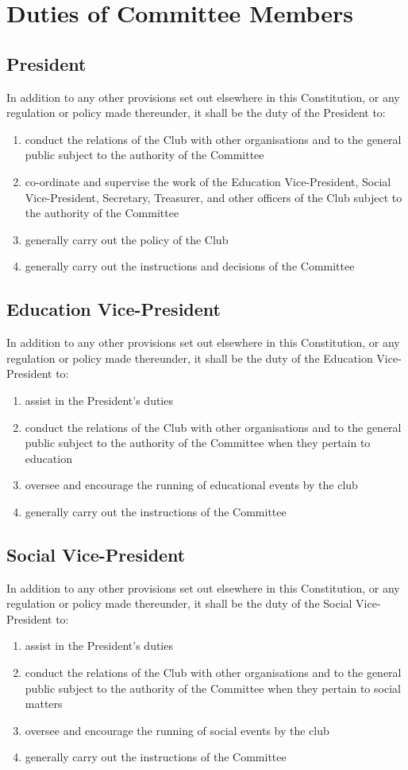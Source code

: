 \documentclass[11pt]{article} %
\begin{document}
\section{Duties of Committee Members}
\subsection{President}
In addition to any other provisions set out elsewhere in this Constitution, or any regulation or policy made thereunder, it shall be the duty of the President to:
\begin{enumerate}
	\item conduct the relations of the Club with other organisations and to the general public subject to the authority of the Committee
	\item co-ordinate and supervise the work of the Education Vice-President, Social Vice-President, Secretary, Treasurer, and other officers of the Club subject to the authority of the Committee
	\item generally carry out the policy of the Club
	\item generally carry out the instructions and decisions of the Committee
\end{enumerate}

\subsection{Education Vice-President}
In addition to any other provisions set out elsewhere in this Constitution, or any regulation or policy made thereunder, it shall be the duty of the Education Vice-President to:
\begin{enumerate}
	\item assist in the President's duties
	\item conduct the relations of the Club with other organisations and to the general public subject to the authority of the Committee when they pertain to education
	\item oversee and encourage the running of educational events by the club
	\item generally carry out the instructions of the Committee
\end{enumerate}

\subsection{Social Vice-President}
In addition to any other provisions set out elsewhere in this Constitution, or any regulation or policy made thereunder, it shall be the duty of the Social Vice-President to:
\begin{enumerate}
	\item assist in the President's duties
	\item conduct the relations of the Club with other organisations and to the general public subject to the authority of the Committee when they pertain to social matters
	\item oversee and encourage the running of social events by the club
	\item generally carry out the instructions of the Committee
\end{enumerate}
\end{document}
